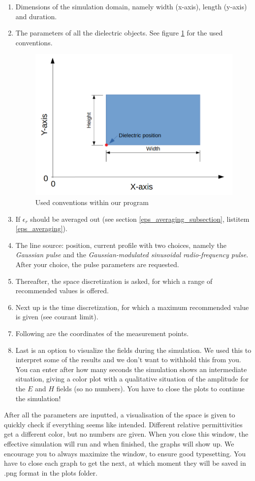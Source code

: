 \documentclass[11pt, a4paper]{article}
\begin{document}
\newpage
\begin{enumerate}
    \item Dimensions of the simulation domain, namely width (x-axis), length (y-axis) and duration.
    \item The parameters of all the dielectric objects. See figure \ref{fig:dielec_axis} for the used conventions.
    \begin{figure}[H]
        \centering
        \includegraphics[width=0.5\linewidth]{fig/dielectric_axis.png}
        \caption{Used conventions within our program}
        \label{fig:dielec_axis}
    \end{figure}
    \item If $\epsilon_r$ should be averaged out (see section \ref{eps_averaging_subsection}, listitem \ref{eps_averaging}).
    \item The line source: position, current profile with two choices, namely the \emph{Gaussian pulse} and the \emph{Gaussian-modulated sinusoidal radio-frequency pulse}. After your choice, the pulse parameters are requested.
    \item Thereafter, the space discretization is asked, for which a range of recommended values is offered.
    \item Next up is the time discretization, for which a maximum recommended value is given (see courant limit).
    \item Following are the coordinates of the measurement points.
    \item Last is an option to visualize the fields during the simulation. We used this to interpret some of the results and we don't want to withhold this from you. You can enter after how many seconds the simulation shows an intermediate situation, giving a color plot with a qualitative situation of the amplitude for the $E$ and $H$ fields (so no numbers). You have to close the plots to continue the simulation!
\end{enumerate}

After all the parameters are inputted, a visualisation of the space is given to quickly check if everything seems like intended. Different relative permittivities get a different color, but no numbers are given.
When you close this window, the effective simulation will run and when finished, the graphs will show up. We encourage you to always maximize the window, to ensure good typesetting.
You have to close each graph to get the next, at which moment they will be saved in .png format in the plots folder.
\end{document}
